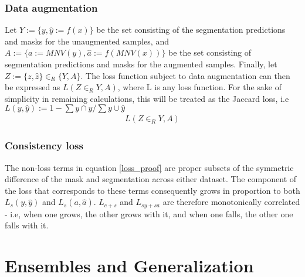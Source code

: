 \subsubsection{Data augmentation}
Let \(Y:=\{y,\hat{y}:=f(x)\}\) be the set consisting of the segmentation predictions and masks for the unaugmented samples, and \(A:=\{a:=MNV(y),\hat{a}:=f(MNV(x))\}\) be the set consisting of segmentation predictions and masks for the augmented samples. Finally, let \(Z:=\{z, \hat{z}\} \in_R \{Y, A\} \). The loss function subject to data augmentation can then be expressed as \(L(Z \in_R Y,A)\), where L is any loss function. For the sake of simplicity in remaining calculations, this will be treated as the Jaccard loss, i.e \(L(y,\hat{y}):=1-\sum y\cap \hat{y} / \sum y \cup \hat{y}\) 
\begin{align*}
L(Z \in_R Y,A)  
\end{align*}
\subsubsection{Consistency loss}


The non-loss terms in equation \ref{loss_proof} are proper subsets of the symmetric difference of the mask and segmentation across either dataset. The component of the loss that corresponds to these terms consequently grows in proportion to both \(L_s(y, \hat{y})\) and \(L_s(a, \hat{a})\). \(L_{c+s}\) and \(L_{sy+sa}\) are therefore monotonically correlated - i.e, when one grows, the other grows with it, and when one falls, the other one falls with it. 
\section{Ensembles and Generalization}
